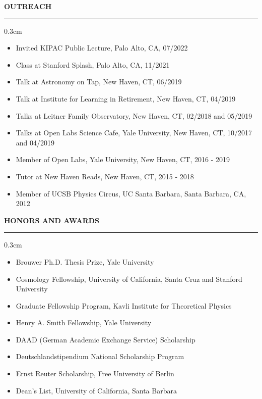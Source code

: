 \documentclass[12pt]{article}
\renewenvironment{section}[1]
  {
  \medskip
  {\color{yaleblue} \MakeUppercase{\bf #1}}
  \smallskip
  \hrule
  \medskip
  \begin{adjustwidth}{0.3cm}{}
  }
  {
  \end{adjustwidth}
  }
\begin{document}
\begin{section}{Outreach}
  \begin{itemize}[leftmargin=0.5cm, topsep=0pt, itemsep=0pt, partopsep=0pt, parsep=0pt]
    \item Invited KIPAC Public Lecture, Palo Alto, CA, 07/2022
    \item Class at Stanford Splash, Palo Alto, CA, 11/2021
    \item Talk at Astronomy on Tap, New Haven, CT, 06/2019
    \item Talk at Institute for Learning in Retirement, New Haven, CT, 04/2019
    \item Talks at Leitner Family Observatory, New Haven, CT, 02/2018 and 05/2019
    \item Talks at Open Labs Science Cafe, Yale University, New Haven, CT, 10/2017 and 04/2019
    \item Member of Open Labs, Yale University, New Haven, CT, 2016 - 2019
    \item Tutor at New Haven Reads, New Haven, CT, 2015 - 2018
    \item Member of UCSB Physics Circus, UC Santa Barbara, Santa Barbara, CA, 2012
  \end{itemize}
\end{section}

\begin{section}{Honors and Awards}
  \begin{itemize}[leftmargin=0.5cm, topsep=0pt, itemsep=0pt, partopsep=0pt, parsep=0pt]
    \item Brouwer Ph.D. Thesis Prize, Yale University
    \item Cosmology Fellowship, University of California, Santa Cruz and Stanford University
    \item Graduate Fellowship Program, Kavli Institute for Theoretical Physics
    \item Henry A. Smith Fellowship, Yale University
    \item DAAD (German Academic Exchange Service) Scholarship
    \item Deutschlandstipendium National Scholarship Program
    \item Ernst Reuter Scholarship, Free University of Berlin
    \item Dean's List, University of California, Santa Barbara
  \end{itemize}
\end{section}
\end{document}
